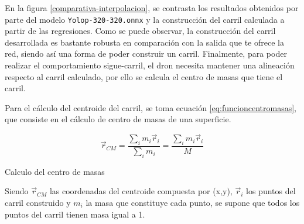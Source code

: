 En la figura \ref{comparativa-interpolacion}, se contrasta los resultados obtenidos por parte del modelo \texttt{Yolop-320-320.onnx} y la construcción del carril calculada a partir de las regresiones. 
Como se puede observar, la construcción del carril desarrollada es bastante robusta en comparación con la salida que te ofrece la red, siendo así una forma de poder construir un 
carril. Finalmente, para poder realizar el comportamiento sigue-carril, el dron necesita mantener una alineación respecto al carril calculado, por ello 
se calcula el centro de masas que tiene el carril.

Para el cálculo del centroide del carril, se toma ecuación \ref{eq:funcioncentromasas}, que consiste en el cálculo de centro de masas de una superficie. 
  \begin{myequation}[h]
    \begin{equation} 
      \vec{r}_{CM} = \frac{\sum_{i}m_{i} \vec{r}_{i}}{\sum_{i}m_{i}} = \frac{\sum_{i}m_{i} \vec{r}_{i}}{M} 
      \label{eq:funcioncentromasas}
    \end{equation} 
    \caption{Calculo del centro de masas}
    \vspace{-1.5em}
  \end{myequation}

  Siendo $\vec{r}_{CM}$ las coordenadas del centroide compuesta por (x,y), $\vec{r}_{i}$ los puntos del carril construido y $m_{i}$ la masa que constituye cada punto, se supone que todos 
  los puntos del carril tienen masa igual a 1.

